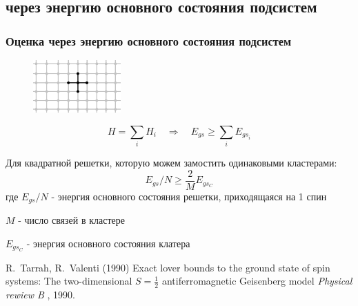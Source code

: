 \documentclass{beamer}
\begin{document}
\subsection{через энергию основного состояния подсистем}
\begin{frame}
\frametitle{Оценка через энергию основного состояния подсистем}
\begin{figure}
\includegraphics[width=0.3\textwidth]{lattice-crest.png}
\end{figure}

$$H=\sum_i H_i \quad \Rightarrow \quad E_{gs}\geqslant\sum_i E_{{gs}_i}$$

Для квадратной решетки, которую можем замостить одинаковыми кластерами:
$$E_{gs}/N \geqslant \frac{2}{M}E_{gs_C}$$
где $E_{gs}/N$ - энергия основного состояния решетки, приходящаяся на 1 спин

$M$ - число связей в кластере

$E_{gs_C}$ - энергия основного состояния клатера
\footnotesize{
\begin{thebibliography}{99}
 R.~Tarrah, R.~Valenti (1990)
\newblock Exact lover bounds to the ground state of spin systems: The two-dimensional $S=\frac12$ antiferromagnetic Geisenberg model
\newblock \emph{Physical rewiew B} , 1990.
\end{thebibliography}
}
\end{frame}
\end{document}
